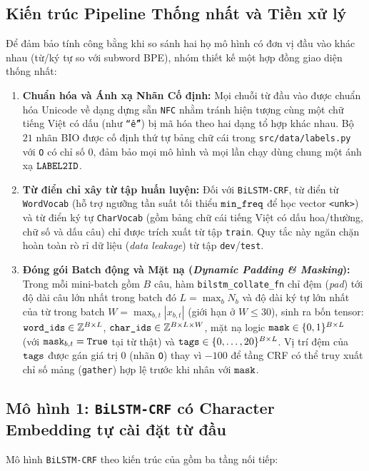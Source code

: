 \documentclass[11pt,a4paper,twocolumn]{article}
\begin{document}
\subsection{Kiến trúc Pipeline Thống nhất và Tiền xử lý}
Để đảm bảo tính công bằng khi so sánh hai họ mô hình có đơn vị đầu vào khác nhau (từ/ký tự so với subword BPE), nhóm thiết kế một hợp đồng giao diện thống nhất:
\begin{enumerate}
  \item \textbf{Chuẩn hóa và Ánh xạ Nhãn Cố định:} Mọi chuỗi từ đầu vào được chuẩn hóa Unicode về dạng dựng sẵn \texttt{NFC} nhằm tránh hiện tượng cùng một chữ tiếng Việt có dấu (như \texttt{``ế''}) bị mã hóa theo hai dạng tổ hợp khác nhau. Bộ $21$ nhãn BIO được cố định thứ tự bảng chữ cái trong \texttt{src/data/labels.py} với \texttt{O} có chỉ số $0$, đảm bảo mọi mô hình và mọi lần chạy dùng chung một ánh xạ $\text{\texttt{LABEL2ID}}$.
  \item \textbf{Từ điển chỉ xây từ tập huấn luyện:} Đối với \texttt{BiLSTM-CRF}, từ điển từ \texttt{WordVocab} (hỗ trợ ngưỡng tần suất tối thiểu $\text{\texttt{min\_freq}}$ để học vector \texttt{<unk>}) và từ điển ký tự \texttt{CharVocab} (gồm bảng chữ cái tiếng Việt có dấu hoa/thường, chữ số và dấu câu) chỉ được trích xuất từ tập \texttt{train}. Quy tắc này ngăn chặn hoàn toàn rò rỉ dữ liệu (\textit{data leakage}) từ tập \texttt{dev}/\texttt{test}.
  \item \textbf{Đóng gói Batch động và Mặt nạ (\textit{Dynamic Padding \& Masking}):} Trong mỗi mini-batch gồm $B$ câu, hàm \texttt{bilstm\_collate\_fn} chỉ đệm (\textit{pad}) tới độ dài câu lớn nhất trong batch đó $L = \max_b N_b$ và độ dài ký tự lớn nhất của từ trong batch $W = \max_{b,t} |x_{b,t}|$ (giới hạn ở $W \le 30$), sinh ra bốn tensor: $\text{\texttt{word\_ids}} \in \mathbb{Z}^{B \times L}$, $\text{\texttt{char\_ids}} \in \mathbb{Z}^{B \times L \times W}$, mặt nạ logic $\text{\texttt{mask}} \in \{0, 1\}^{B \times L}$ (với $\text{\texttt{mask}}_{b,t} = \text{\texttt{True}}$ tại từ thật) và $\text{\texttt{tags}} \in \{0,\dots,20\}^{B \times L}$. Vị trí đệm của $\text{\texttt{tags}}$ được gán giá trị $0$ (nhãn \texttt{O}) thay vì $-100$ để tầng CRF có thể truy xuất chỉ số mảng (\texttt{gather}) hợp lệ trước khi nhân với $\text{\texttt{mask}}$.
\end{enumerate}

\subsection{Mô hình 1: \texttt{BiLSTM-CRF} có Character Embedding tự cài đặt từ đầu}
\label{sec:method_bilstm}
Mô hình \texttt{BiLSTM-CRF} theo kiến trúc của \citet{ma-hovy-2016-end} gồm ba tầng nối tiếp:
\end{document}
